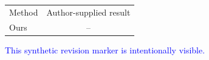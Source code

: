 \newif\ifshowrevisionmarkup
\showrevisionmarkuptrue
\newcommand{\revadd}[1]{\ifshowrevisionmarkup\textcolor{blue}{#1}\else#1\fi}
\begin{tabular}{lc}
Method & Author-supplied result\\
Ours & --\\
\end{tabular}
\revadd{This synthetic revision marker is intentionally visible.}
